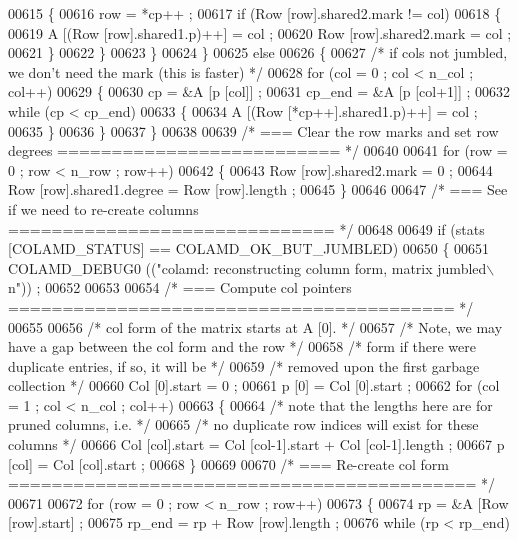 \begin{DoxyCode}
{{{{{{{{{{00615       \{
00616     row = *cp++ ;
00617     \textcolor{keywordflow}{if} (Row [row].shared2.mark != col)
00618     \{
00619       A [(Row [row].shared1.p)++] = col ;
00620       Row [row].shared2.mark = col ;
00621     \}
00622       \}
00623     \}
00624   \}
00625   \textcolor{keywordflow}{else}
00626   \{
00627     \textcolor{comment}{/* if cols not jumbled, we don't need the mark (this is faster) */}
00628     \textcolor{keywordflow}{for} (col = 0 ; col < n\_col ; col++)
00629     \{
00630       cp = &A [p [col]] ;
00631       cp\_end = &A [p [col+1]] ;
00632       \textcolor{keywordflow}{while} (cp < cp\_end)
00633       \{
00634     A [(Row [*cp++].shared1.p)++] = col ;
00635       \}
00636     \}
00637   \}
00638 
00639   \textcolor{comment}{/* === Clear the row marks and set row degrees ========================== */}
00640 
00641   \textcolor{keywordflow}{for} (row = 0 ; row < n\_row ; row++)
00642   \{
00643     Row [row].shared2.mark = 0 ;
00644     Row [row].shared1.degree = Row [row].length ;
00645   \}
00646 
00647   \textcolor{comment}{/* === See if we need to re-create columns ============================== */}
00648 
00649   \textcolor{keywordflow}{if} (stats [COLAMD\_STATUS] == COLAMD\_OK\_BUT\_JUMBLED)
00650   \{
00651     COLAMD\_DEBUG0 ((\textcolor{stringliteral}{"colamd: reconstructing column form, matrix jumbled\(\backslash\)n"})) ;
00652 
00653 
00654     \textcolor{comment}{/* === Compute col pointers ========================================= */}
00655 
00656     \textcolor{comment}{/* col form of the matrix starts at A [0]. */}
00657     \textcolor{comment}{/* Note, we may have a gap between the col form and the row */}
00658     \textcolor{comment}{/* form if there were duplicate entries, if so, it will be */}
00659     \textcolor{comment}{/* removed upon the first garbage collection */}
00660     Col [0].start = 0 ;
00661     p [0] = Col [0].start ;
00662     \textcolor{keywordflow}{for} (col = 1 ; col < n\_col ; col++)
00663     \{
00664       \textcolor{comment}{/* note that the lengths here are for pruned columns, i.e. */}
00665       \textcolor{comment}{/* no duplicate row indices will exist for these columns */}
00666       Col [col].start = Col [col-1].start + Col [col-1].length ;
00667       p [col] = Col [col].start ;
00668     \}
00669 
00670     \textcolor{comment}{/* === Re-create col form =========================================== */}
00671 
00672     \textcolor{keywordflow}{for} (row = 0 ; row < n\_row ; row++)
00673     \{
00674       rp = &A [Row [row].start] ;
00675       rp\_end = rp + Row [row].length ;
00676       \textcolor{keywordflow}{while} (rp < rp\_end)
}}}}}}}}}}
\end{DoxyCode}
